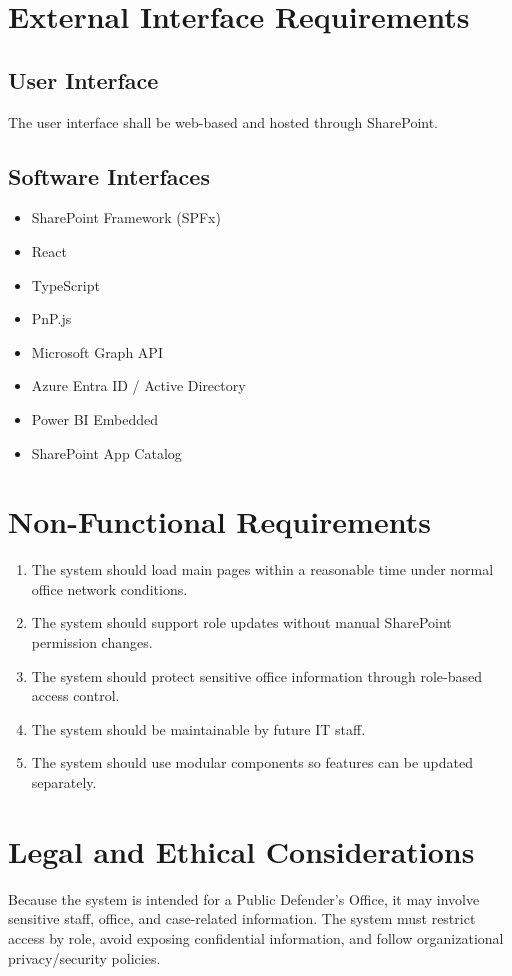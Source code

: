 \documentclass[12pt]{article}
\begin{document}
\section{External Interface Requirements}
\subsection{User Interface}
The user interface shall be web-based and hosted through SharePoint.

\subsection{Software Interfaces}
\begin{itemize}
\item SharePoint Framework (SPFx)
\item React
\item TypeScript
\item PnP.js
\item Microsoft Graph API
\item Azure Entra ID / Active Directory
\item Power BI Embedded
\item SharePoint App Catalog
\end{itemize}

\section{Non-Functional Requirements}
\begin{enumerate}[label=NFR-\arabic*]
\item The system should load main pages within a reasonable time under normal office network conditions.
\item The system should support role updates without manual SharePoint permission changes.
\item The system should protect sensitive office information through role-based access control.
\item The system should be maintainable by future IT staff.
\item The system should use modular components so features can be updated separately.
\end{enumerate}

\section{Legal and Ethical Considerations}
Because the system is intended for a Public Defender's Office, it may involve sensitive staff, office, and case-related information. The system must restrict access by role, avoid exposing confidential information, and follow organizational privacy/security policies.
\end{document}
